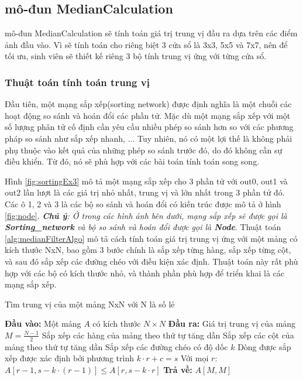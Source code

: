 \subsection{mô-đun MedianCalculation}
mô-đun MedianCalculation sẽ tính toán giá trị trung vị đầu ra dựa trên các điểm ảnh đầu vào. Vì sẽ tính toán cho riêng biệt 3 cửa sổ là 3x3, 5x5 và 7x7, nên để tối ưu, sinh viên sẽ thiết kế riêng 3 bộ tính trung vị ứng với từng cửa sổ.


\subsubsection{Thuật toán tính toán trung vị}
Đầu tiên, một mạng sắp xếp(sorting network) được định nghĩa là một chuỗi các hoạt động so sánh và hoán đổi các phần tử. Mặc dù một mạng sắp xếp với một số lượng phân tử cố định cần yêu cầu nhiều phép so sánh hơn so với các phương pháp so sánh như sắp xếp nhanh, ... Tuy nhiên, nó có một lợi thế là không phải phụ thuộc vào kết quả của những phép so sánh trước đó, do đó không cần sự điều khiển. Từ đó, nó sẽ phù hợp với các bài toán tính toán song song.


Hình \ref{fig:sortingEx3} mô tả một mạng sắp xếp cho 3 phần tử với out0, out1 và out2 lần lượt là các giá trị nhỏ nhất, trung vị và lớn nhất trong 3 phần tử đó. Các ô 1, 2 và 3 là các bộ so sánh và hoán đổi có kiến trúc được mô tả ở hình \ref{fig:node}. \textit{\textbf{Chú ý}: Ở trong các hình ảnh bên dưới, mạng sắp xếp sẽ được gọi là \textbf{Sorting\_network} và bộ so sánh và hoán đổi được gọi là \textbf{Node}}. Thuật toán \ref{alg:medianFilterAlgo} mô tả cách tính toán giá trị trung vị ứng với một mảng có kích thước NxN, bao gồm 3 bước chính là sắp xếp từng hàng, sắp xếp từng cột, và sau đó sắp xếp các đường chéo với điều kiện xác định. Thuật toán này rất phù hợp với các bộ có kích thước nhỏ, và thành phần phù hợp để triển khai là các mạng sắp xếp.

\begin{algorithm}
	\caption{Tìm trung vị của một mảng NxN với N là số lẻ \cite{altivec}}
	\begin{algorithmic}[1]
		\State \textbf{Đầu vào:} Một mảng $A$ có kích thước $N \times N$
		\State \textbf{Đầu ra:} Giá trị trung vị của mảng
		\State $M = \frac{N - 1}{2}$
		\State Sắp xếp các hàng của mảng theo thứ tự tăng dần
		\State Sắp xếp các cột của mảng theo thứ tự tăng dần
		\State Sắp xếp các đường chéo có độ dốc $k$
		\State Dòng được sắp xếp được xác định bởi phương trình $k \cdot r + c = s$
		\State Với mọi $r$: $A[r-1, s - k \cdot (r-1)] \leq A[r, s - k \cdot r]$
		\EndFor
		\EndFor
		\State \textbf{Trả về:} $A[M, M]$
	\end{algorithmic}
	\label{alg:medianFilterAlgo}
\end{algorithm}




